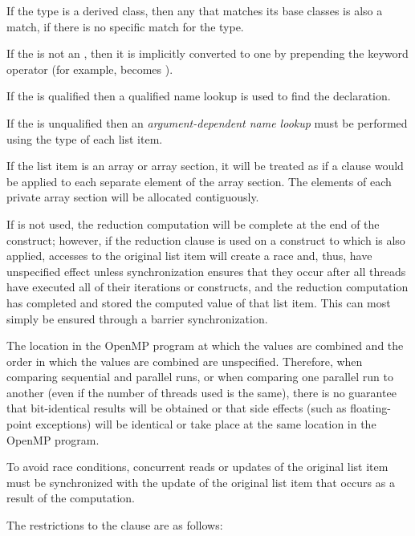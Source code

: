 {{{{\cppspecificstart
If the type is a derived class, then any  that matches its base classes 
is also a match, if there is no specific match for the type.

If the  is not an , then it is implicitly converted to one by 
prepending the keyword operator (for example, \code{+} becomes ).

If the  is qualified then a qualified name lookup is used to find the 
declaration.

If the  is unqualified then an \emph{argument-dependent name lookup} must 
be performed using the type of each list item.
\cppspecificend

If the list item is an array or array section, it will be treated as
if a  clause would be applied to each separate element
of the array section. The elements of each private array section will
be allocated contiguously.

If  is not used, the reduction computation will be complete at the end of the 
construct; however, if the reduction clause is used on a construct to which  is 
also applied, accesses to the original list item will create a race and, thus, have 
unspecified effect unless synchronization ensures that they occur after all threads have 
executed all of their iterations or  constructs, and the reduction computation 
has completed and stored the computed value of that list item. This can most simply be 
ensured through a barrier synchronization. 

The location in the OpenMP program at which the values are combined and the order in 
which the values are combined are unspecified. Therefore, when comparing sequential 
and parallel runs, or when comparing one parallel run to another (even if the number of 
threads used is the same), there is no guarantee that bit-identical results will be obtained 
or that side effects (such as floating-point exceptions) will be identical or take place at 
the same location in the OpenMP program.

To avoid race conditions, concurrent reads or updates of the original list item must be 
synchronized with the update of the original list item that occurs as a result of the 
 computation.

\restrictions
The restrictions to the  clause are as follows:

}}}}
